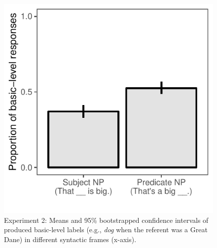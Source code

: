 \documentclass[10pt,letterpaper]{article}
\begin{document}
\begin{figure}[t]
\begin{center}
\includegraphics[width=0.7\linewidth]{expt-np-prod-prereg-bars.pdf}
\end{center}
\vspace{-1cm}
\caption{Experiment 2: Means and 95\% bootstrapped confidence intervals of produced basic-level labels (e.g., \emph{dog} when the referent was a Great Dane) in different syntactic frames (x-axis).}
\label{np-production}
\vspace{-0.2cm}
\end{figure}
\end{document}
